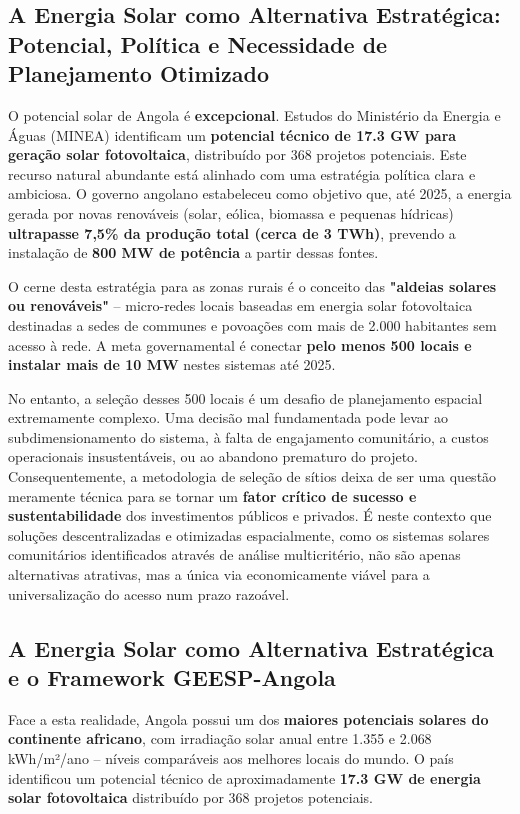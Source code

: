 \documentclass[12pt, a4paper]{article}
\begin{document}
\subsection{A Energia Solar como Alternativa Estratégica: Potencial, Política e Necessidade de Planejamento Otimizado}

O potencial solar de Angola é \textbf{excepcional}. Estudos do Ministério da Energia e Águas (MINEA) identificam um \textbf{potencial técnico de 17.3 GW para geração solar fotovoltaica}, distribuído por 368 projetos potenciais. Este recurso natural abundante está alinhado com uma estratégia política clara e ambiciosa. O governo angolano estabeleceu como objetivo que, até 2025, a energia gerada por novas renováveis (solar, eólica, biomassa e pequenas hídricas) \textbf{ultrapasse 7,5\% da produção total (cerca de 3 TWh)}, prevendo a instalação de \textbf{800 MW de potência} a partir dessas fontes.

O cerne desta estratégia para as zonas rurais é o conceito das \textbf{"aldeias solares ou renováveis"} – micro-redes locais baseadas em energia solar fotovoltaica destinadas a sedes de communes e povoações com mais de 2.000 habitantes sem acesso à rede. A meta governamental é conectar \textbf{pelo menos 500 locais e instalar mais de 10 MW} nestes sistemas até 2025. 

No entanto, a seleção desses 500 locais é um desafio de planejamento espacial extremamente complexo. Uma decisão mal fundamentada pode levar ao subdimensionamento do sistema, à falta de engajamento comunitário, a custos operacionais insustentáveis, ou ao abandono prematuro do projeto. Consequentemente, a metodologia de seleção de sítios deixa de ser uma questão meramente técnica para se tornar um \textbf{fator crítico de sucesso e sustentabilidade} dos investimentos públicos e privados. É neste contexto que soluções descentralizadas e otimizadas espacialmente, como os sistemas solares comunitários identificados através de análise multicritério, não são apenas alternativas atrativas, mas a única via economicamente viável para a universalização do acesso num prazo razoável.

\subsection{A Energia Solar como Alternativa Estratégica e o Framework GEESP-Angola}

Face a esta realidade, Angola possui um dos \textbf{maiores potenciais solares do continente africano}, com irradiação solar anual entre 1.355 e 2.068 kWh/m²/ano – níveis comparáveis aos melhores locais do mundo. O país identificou um potencial técnico de aproximadamente \textbf{17.3 GW de energia solar fotovoltaica} distribuído por 368 projetos potenciais.
\end{document}
